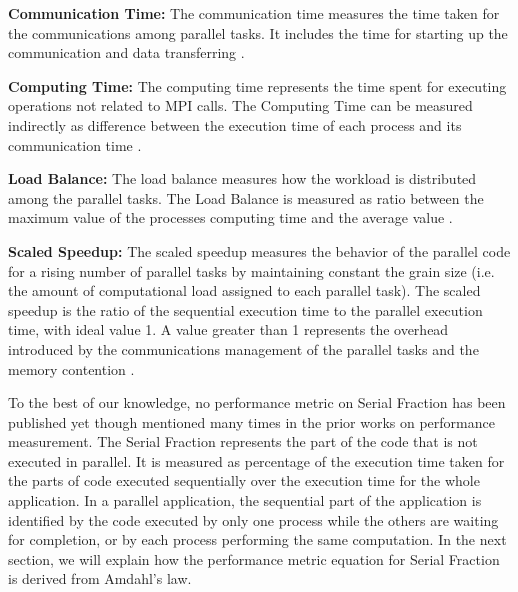 \textbf{Communication Time: } The     communication time     measures     the     time     taken     for     the     communications among parallel    tasks.    It includes    the    time    for    starting    up    the    communication    and data    transferring \cite{WinNT}.

\textbf{Computing Time: } The    computing    time    represents    the    time    spent    for    executing    operations    not    related    to MPI    calls. The     Computing     Time     can     be     measured     indirectly     as     difference     between     the     execution time    of    each    process    and    its    communication    time \cite{WinNT}.

\textbf{Load    Balance: } The    load    balance    measures    how    the    workload    is    distributed    among    the    parallel    tasks. The     Load     Balance     is     measured     as     ratio     between     the     maximum     value     of     the processes computing    time    and    the    average    value \cite{WinNT}.

\textbf{Scaled    Speedup: } The scaled    speedup measures    the    behavior    of    the    parallel    code    for    a    rising    number    of parallel     tasks     by     maintaining     constant     the     grain     size     (i.e.     the     amount     of     computational     load assigned    to    each    parallel    task). The scaled    speedup    is    the    ratio    of    the sequential execution    time    to    the    parallel    execution
time, with ideal    value 1.    A    value    greater    than    1    represents    the    overhead    introduced    by the     communications management     of     the     parallel tasks and the memory    contention \cite{WinNT}.


To the best of our knowledge, no performance metric on Serial Fraction has been published yet though mentioned many times in the prior works on performance measurement. The Serial Fraction    represents the    part    of    the code that is    not executed in    parallel. It is measured as    percentage    of    the    execution time    taken for
the parts of code executed    sequentially    over    the execution    time for    the    whole    application.    In    a    parallel application,     the     sequential     part     of     the application     is identified     by the     code executed     by     only one     process     while     the     others     are     waiting     for completion,     or by     each     process performing the same    computation. In the next section, we will explain how the performance metric equation for Serial Fraction is derived from Amdahl's law.





